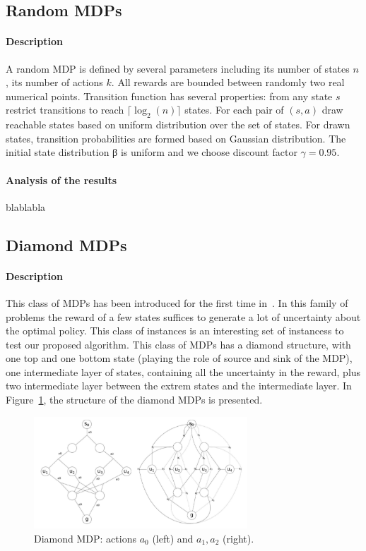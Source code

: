 \subsection{Random MDPs}
\paragraph{Description}
A random MDP is defined by several parameters including its number of states $n$ , its number of actions $k$. All rewards are bounded between randomly two real numerical points. Transition function has several properties: from any state $s$ restrict transitions to reach $\lceil \log_2(n) \rceil$ states. For each pair of $(s, a)$ draw reachable states based on uniform
distribution over the set of states. For drawn states, transition probabilities are formed based on Gaussian distribution.
The initial state distribution β is uniform and we choose discount factor $\gamma = 0.95$. 
\paragraph{Analysis of the results}
blablabla


\subsection{Diamond MDPs}
\paragraph{Description}
This class of MDPs has been introduced for the first time in~\cite{benavent2018}. 
In this family of problems the reward of a few states suffices to generate a lot of uncertainty about the optimal policy. This class of instances is an interesting set of instancess to test our proposed algorithm.
This class of MDPs has a diamond structure, with one top and one bottom state (playing the role of source and sink of the  MDP), one intermediate layer of states, containing all the uncertainty in the reward, plus two intermediate layer between the extrem states and the intermediate layer.
In Figure~\ref{fig:diamond}, the structure of the diamond MDPs is presented.

\begin{figure}[h]
\begin{center}
\includegraphics[width=8cm]{images/diamond.png}
\end{center}
\caption{Diamond MDP: actions $a_0$ (left) and $a_1, a_2$ (right).}
\label{fig:diamond}
\end{figure}

